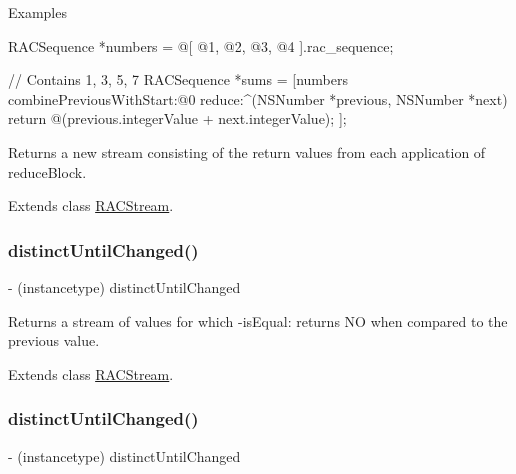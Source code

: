 Examples \begin{DoxyVerb} RACSequence *numbers = @[ @1, @2, @3, @4 ].rac_sequence;

 // Contains 1, 3, 5, 7
 RACSequence *sums = [numbers combinePreviousWithStart:@0 reduce:^(NSNumber *previous, NSNumber *next) {
     return @(previous.integerValue + next.integerValue);
 }];
\end{DoxyVerb}


Returns a new stream consisting of the return values from each application of {\ttfamily reduce\+Block}. 

Extends class \mbox{\hyperlink{interface_r_a_c_stream_a698f6ef68be8d3cb34f9be6efaaa5af7}{R\+A\+C\+Stream}}.

\mbox{\label{category_r_a_c_stream_07_operations_08_a3af010b929b0c232ddbaa52f574fb888}} 
\subsubsection{\texorpdfstring{distinct\+Until\+Changed()}{distinctUntilChanged()}\hspace{0.1cm}{\footnotesize\ttfamily [1/3]}}
{\footnotesize\ttfamily -\/ (instancetype) distinct\+Until\+Changed \begin{DoxyParamCaption}{ }\end{DoxyParamCaption}}

Returns a stream of values for which -\/is\+Equal\+: returns NO when compared to the previous value. 

Extends class \mbox{\hyperlink{interface_r_a_c_stream_a3af010b929b0c232ddbaa52f574fb888}{R\+A\+C\+Stream}}.

\mbox{\label{category_r_a_c_stream_07_operations_08_a3af010b929b0c232ddbaa52f574fb888}} 
\subsubsection{\texorpdfstring{distinct\+Until\+Changed()}{distinctUntilChanged()}\hspace{0.1cm}{\footnotesize\ttfamily [2/3]}}
{\footnotesize\ttfamily -\/ (instancetype) distinct\+Until\+Changed \begin{DoxyParamCaption}{ }\end{DoxyParamCaption}}

